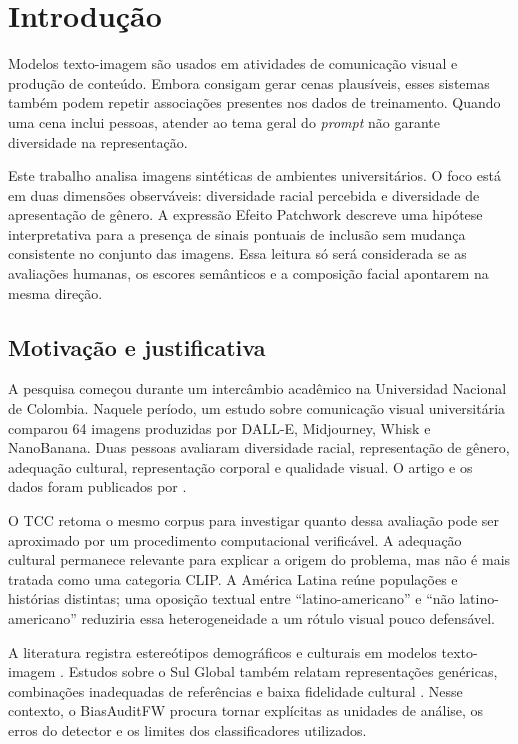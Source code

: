 \chapter{Introdução}
\label{cap:introducao}

Modelos texto-imagem são usados em atividades de comunicação visual e produção de conteúdo. Embora consigam gerar cenas plausíveis, esses sistemas também podem repetir associações presentes nos dados de treinamento. Quando uma cena inclui pessoas, atender ao tema geral do \textit{prompt} não garante diversidade na representação.

Este trabalho analisa imagens sintéticas de ambientes universitários. O foco está em duas dimensões observáveis: diversidade racial percebida e diversidade de apresentação de gênero. A expressão Efeito Patchwork descreve uma hipótese interpretativa para a presença de sinais pontuais de inclusão sem mudança consistente no conjunto das imagens. Essa leitura só será considerada se as avaliações humanas, os escores semânticos e a composição facial apontarem na mesma direção.

\section{Motivação e justificativa}

A pesquisa começou durante um intercâmbio acadêmico na Universidad Nacional de Colombia. Naquele período, um estudo sobre comunicação visual universitária comparou 64 imagens produzidas por DALL-E, Midjourney, Whisk e NanoBanana. Duas pessoas avaliaram diversidade racial, representação de gênero, adequação cultural, representação corporal e qualidade visual. O artigo e os dados foram publicados por .

O TCC retoma o mesmo corpus para investigar quanto dessa avaliação pode ser aproximado por um procedimento computacional verificável. A adequação cultural permanece relevante para explicar a origem do problema, mas não é mais tratada como uma categoria CLIP. A América Latina reúne populações e histórias distintas; uma oposição textual entre ``latino-americano'' e ``não latino-americano'' reduziria essa heterogeneidade a um rótulo visual pouco defensável.

A literatura registra estereótipos demográficos e culturais em modelos texto-imagem \cite{birhane2021, bianchi2023, schneider2025}. Estudos sobre o Sul Global também relatam representações genéricas, combinações inadequadas de referências e baixa fidelidade cultural \cite{mim2024, hall2024, zhang2024cultural}. Nesse contexto, o BiasAuditFW procura tornar explícitas as unidades de análise, os erros do detector e os limites dos classificadores utilizados.

